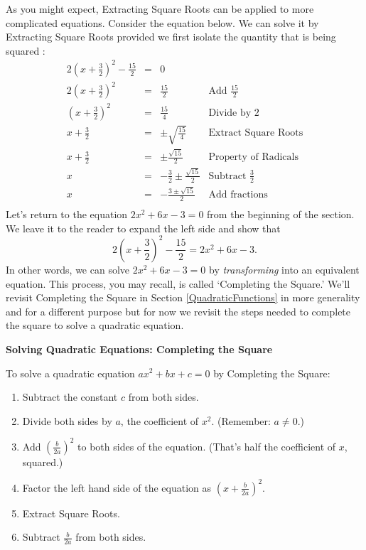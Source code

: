 \documentclass{ximera}
\begin{document}
As you might expect, Extracting Square Roots can be applied to more complicated equations.  Consider the equation below.  We can solve it by Extracting Square Roots provided we first isolate the quantity that is being squared :\[ \begin{array}{rclr}

2\left(x + \frac{3}{2}\right)^2 - \frac{15}{2} & = & 0 & \\  
2\left(x + \frac{3}{2}\right)^2 & = & \frac{15}{2} & \text{Add $\frac{15}{2}$} \\
\left(x + \frac{3}{2}\right)^2 & = & \frac{15}{4} & \text{Divide by $2$} \\
x + \frac{3}{2} & = & \pm \sqrt{\frac{15}{4}} & \text{Extract Square Roots} \\  
x + \frac{3}{2} & = & \pm \frac{\sqrt{15}}{2} & \text{Property of Radicals} \\  
x & = & -\frac{3}{2} \pm \frac{\sqrt{15}}{2}  & \text{Subtract $\frac{3}{2}$} \\  
x & = & -\frac{3 \pm \sqrt{15}}{2}  & \text{Add fractions} \\

\end{array} \] Let's return to the equation $2x^2 + 6x - 3 = 0$ from the beginning of the section.  We leave it to the reader to expand the left side and show that \[2\left(x + \frac{3}{2}\right)^2 - \frac{15}{2} =  2x^2 + 6x - 3. \] In other words, we can solve $2x^2 + 6x - 3 = 0$  by \textit{transforming} into an equivalent equation. This process, you may recall, is called `Completing the Square.'  We'll revisit Completing the Square in Section \ref{QuadraticFunctions} in more generality and for a different purpose but for now we revisit the steps needed to complete the square to solve a quadratic equation.

 

\label{completesquareeqns}


\centerline{\textbf{Solving Quadratic Equations:  Completing the Square}}
\vspace{0.05in}
To solve a quadratic equation $ax^2 + bx + c = 0$ by Completing the Square:

\begin{enumerate}

\item  Subtract the constant $c$ from both sides.
\item  Divide both sides by $a$,  the coefficient of $x^2$.  (Remember:  $a \neq 0$.)
\item  Add $\left(\frac{b}{2a}\right)^2$ to both sides of the equation. (That's half the coefficient of $x$, squared.)
\item  Factor the left hand side of the equation as $\left(x + \frac{b}{2a}\right)^2$.
\item  Extract Square Roots.
\item  Subtract $\frac{b}{2a}$ from both sides.

\end{enumerate}
\end{document}
